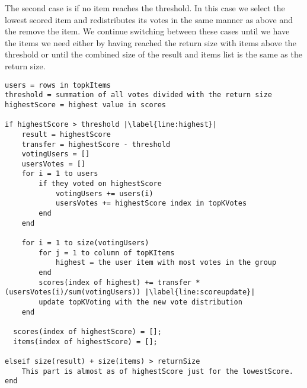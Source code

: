 The second case is if no item reaches the threshold. In this case we select the lowest scored item and redistributes its votes in the same manner as above and the remove the item. We continue switching between these cases until we have the items we need either by having reached the return size with items above the threshold or until the combined size of the result and items list is the same as the return size.

\begin{lstlisting}[caption={Implementation for the transfer method},label=lst:BTCtransfer]
users = rows in topkItems
threshold = summation of all votes divided with the return size
highestScore = highest value in scores

if highestScore > threshold |\label{line:highest}|
	result = highestScore
	transfer = highestScore - threshold
	votingUsers = []
	usersVotes = []
	for i = 1 to users 
		if they voted on highestScore
			votingUsers += users(i)
			usersVotes += highestScore index in topKVotes
		end
	end
		
	for i = 1 to size(votingUsers)
		for j = 1 to column of topKItems
			highest = the user item with most votes in the group
		end
		scores(index of highest) += transfer * (usersVotes(i)/sum(votingUsers)) |\label{line:scoreupdate}|
		update topKVoting with the new vote distribution 
	end
	
  scores(index of highestScore) = [];
  items(index of highestScore) = [];
	
elseif size(result) + size(items) > returnSize
	This part is almost as of highestScore just for the lowestScore.
end

\end{lstlisting}